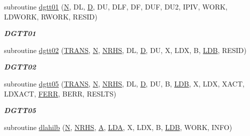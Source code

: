 \begin{DoxyCompactItemize}
subroutine \hyperlink{group__double__lin_gae8bcacf5aff31505da444b9df968151c}{dgtt01} (\hyperlink{polmisc_8c_a0240ac851181b84ac374872dc5434ee4}{N}, D\+L, \hyperlink{odrpack_8h_a7dae6ea403d00f3687f24a874e67d139}{D}, D\+U, D\+L\+F, D\+F, D\+U\+F, D\+U2, I\+P\+I\+V, W\+O\+R\+K, L\+D\+W\+O\+R\+K, R\+W\+O\+R\+K, R\+E\+S\+I\+D)
\begin{DoxyCompactList}\small\item\em {\bfseries D\+G\+T\+T01} \end{DoxyCompactList}\item 
subroutine \hyperlink{group__double__lin_ga98491af713de82ec5c41e18a655bea06}{dgtt02} (\hyperlink{superlu__enum__consts_8h_a0c4e17b2d5cea33f9991ccc6a6678d62a1f61e3015bfe0f0c2c3fda4c5a0cdf58}{T\+R\+A\+N\+S}, \hyperlink{polmisc_8c_a0240ac851181b84ac374872dc5434ee4}{N}, \hyperlink{example__user_8c_aa0138da002ce2a90360df2f521eb3198}{N\+R\+H\+S}, D\+L, \hyperlink{odrpack_8h_a7dae6ea403d00f3687f24a874e67d139}{D}, D\+U, X, L\+D\+X, B, \hyperlink{example__user_8c_a50e90a7104df172b5a89a06c47fcca04}{L\+D\+B}, R\+E\+S\+I\+D)
\begin{DoxyCompactList}\small\item\em {\bfseries D\+G\+T\+T02} \end{DoxyCompactList}\item 
subroutine \hyperlink{group__double__lin_gac2b2f67cf0d1759269f889fea72658ac}{dgtt05} (\hyperlink{superlu__enum__consts_8h_a0c4e17b2d5cea33f9991ccc6a6678d62a1f61e3015bfe0f0c2c3fda4c5a0cdf58}{T\+R\+A\+N\+S}, \hyperlink{polmisc_8c_a0240ac851181b84ac374872dc5434ee4}{N}, \hyperlink{example__user_8c_aa0138da002ce2a90360df2f521eb3198}{N\+R\+H\+S}, D\+L, \hyperlink{odrpack_8h_a7dae6ea403d00f3687f24a874e67d139}{D}, D\+U, B, \hyperlink{example__user_8c_a50e90a7104df172b5a89a06c47fcca04}{L\+D\+B}, X, L\+D\+X, X\+A\+C\+T, L\+D\+X\+A\+C\+T, \hyperlink{superlu__enum__consts_8h_af00a42ecad444bbda75cde1b64bd7e72a78fd14d7abebae04095cfbe02928f153}{F\+E\+R\+R}, B\+E\+R\+R, R\+E\+S\+L\+T\+S)
\begin{DoxyCompactList}\small\item\em {\bfseries D\+G\+T\+T05} \end{DoxyCompactList}\item 
subroutine \hyperlink{group__double__lin_gacd60e0db880c818055c7990ca42261d5}{dlahilb} (\hyperlink{polmisc_8c_a0240ac851181b84ac374872dc5434ee4}{N}, \hyperlink{example__user_8c_aa0138da002ce2a90360df2f521eb3198}{N\+R\+H\+S}, \hyperlink{classA}{A}, \hyperlink{example__user_8c_ae946da542ce0db94dced19b2ecefd1aa}{L\+D\+A}, X, L\+D\+X, B, \hyperlink{example__user_8c_a50e90a7104df172b5a89a06c47fcca04}{L\+D\+B}, W\+O\+R\+K, I\+N\+F\+O)

\end{DoxyCompactItemize}
